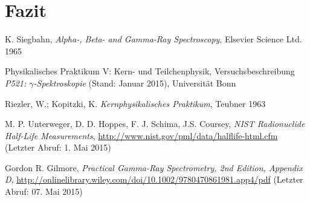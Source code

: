 \documentclass[11pt, a4paper]{article}
\numberwithin{equation}{section}
\begin{document}
\section{Fazit}

\FloatBarrier
\vspace{\fill}
\begin{thebibliography}{19}
	K. Siegbahn,
	\emph{Alpha-, Beta- and Gamma-Ray Spectroscopy},
	Elsevier Science Ltd. 1965

	Physikalisches Praktikum V: Kern- und Teilchenphysik,
	Versuchsbeschreibung \emph{P521: $\gamma$-Spektroskopie} (Stand: Januar 2015),
	Universität Bonn	

	Riezler, W.; Kopitzki, K.
	\emph{Kernphysikalisches Praktikum},
	Teubner 1963

	M. P. Unterweger, D. D. Hoppes, F. J. Schima, J.S. Coursey,
	\emph{NIST Radionuclide Half-Life Measurements},
	\url{http://www.nist.gov/pml/data/halflife-html.cfm} (Letzter Abruf: 1. Mai 2015)
	
	Gordon R. Gilmore,
	\emph{Practical Gamma-Ray Spectrometry, 2nd Edition, Appendix D},
	\url{http://onlinelibrary.wiley.com/doi/10.1002/9780470861981.app4/pdf} (Letzter Abruf: 07. Mai 2015)

\end{thebibliography}
\end{document}
